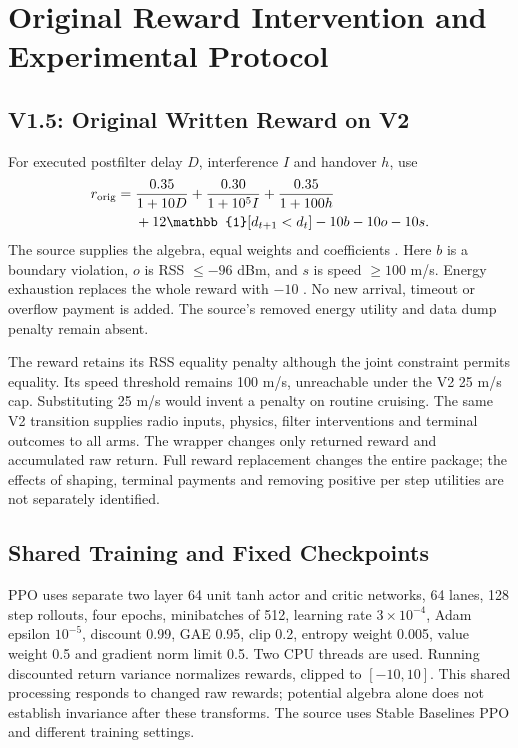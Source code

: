 \section{Original Reward Intervention and Experimental Protocol}
\subsection{V1.5: Original Written Reward on V2}
For executed postfilter delay $D$, interference $I$ and handover $h$, use
\begin{align}
r_{\rm orig}={}&\frac{0.35}{1+10D}+\frac{0.30}{1+10^5I}
 +\frac{0.35}{1+100h}\nonumber\\
 &+12\mathbb{1}[d_{t+1}<d_t]-10b-10o-10s.
\end{align}
The source supplies the algebra, equal weights and coefficients
\cite[p.~12, Eqs.~(13)--(14); p.~15, Table~3]{thesis}. Here $b$ is a boundary
violation, $o$ is RSS $\leq-96$ dBm, and $s$ is speed $\geq100$ m/s.
Energy exhaustion replaces the whole reward with $-10$
\cite[p.~12, Sec.~5.2]{thesis}. No new arrival, timeout or overflow payment
is added. The source's removed energy utility and data dump penalty remain
absent\cite[pp.~20--21, Sec.~7.3]{thesis}.

The reward retains its RSS equality penalty although the joint constraint
permits equality. Its speed threshold remains 100 m/s, unreachable under the
V2 25 m/s cap. Substituting 25 m/s would invent a penalty on routine cruising.
The same V2 transition supplies radio inputs, physics, filter interventions
and terminal outcomes to all arms. The wrapper changes only returned reward
and accumulated raw return. Full reward replacement changes the entire package;
the effects of shaping, terminal payments and removing positive per step
utilities are not separately identified.

\subsection{Shared Training and Fixed Checkpoints}
PPO uses separate two layer 64 unit tanh actor and critic networks, 64 lanes,
128 step rollouts, four epochs, minibatches of 512, learning rate
$3\times10^{-4}$, Adam epsilon $10^{-5}$, discount 0.99, GAE 0.95, clip 0.2,
entropy weight 0.005, value weight 0.5 and gradient norm limit 0.5.
Two CPU threads are used. Running discounted return variance normalizes rewards,
clipped to $[-10,10]$. This shared processing responds to changed raw rewards;
potential algebra alone does not establish invariance after these transforms.
The source uses Stable Baselines PPO\cite[p.~13, Sec.~5.3]{thesis} and different
training settings\cite[pp.~15--16, Sec.~6.2 and Table~4]{thesis}.


